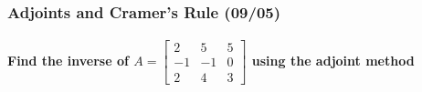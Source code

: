 \documentclass[
  letterpaper,
  DIV=11,
  numbers=noendperiod]{scrartcl}
\let\oldparagraph\paragraph
\renewcommand{\paragraph}[1]{\oldparagraph{#1}\mbox{}}
\begin{document}
\newpage{}

\hypertarget{adjoints-and-cramers-rule-0905}{%
\subsubsection{Adjoints and Cramer's Rule
(09/05)}\label{adjoints-and-cramers-rule-0905}}

\hypertarget{find-the-inverse-of-abeginbmatrix2-5-5--1--1-0-2-4-3endbmatrix-using-the-adjoint-method}{%
\paragraph{\texorpdfstring{Find the inverse of
\(A=\begin{bmatrix}2 & 5 & 5 \\ -1 & -1 & 0 \\ 2 & 4 & 3\end{bmatrix}\)
using the adjoint
method}{Find the inverse of A=\textbackslash begin\{bmatrix\}2 \& 5 \& 5 \textbackslash\textbackslash{} -1 \& -1 \& 0 \textbackslash\textbackslash{} 2 \& 4 \& 3\textbackslash end\{bmatrix\} using the adjoint method}}\label{find-the-inverse-of-abeginbmatrix2-5-5--1--1-0-2-4-3endbmatrix-using-the-adjoint-method}}
\end{document}
